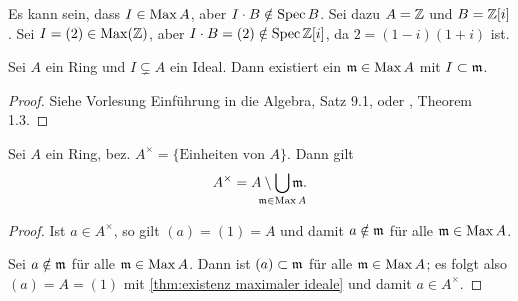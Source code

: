\documentclass[12pt,a4paper]{scrartcl}
\theoremstyle{cplain}
\theoremstyle{cdef}
\begin{document}
\begin{bem}
	Es kann sein, dass $I \in \operatorname{Max} A$, aber $I \cdot B \notin \operatorname{Spec} B$. Sei dazu $A=\mathbb Z$ und $B=\mathbb Z[i]$. Sei $I=(2) \in \operatorname{Max}(\mathbb Z)$, aber $I \cdot B = (2) \notin \operatorname{Spec} \mathbb Z[i]$, da $2=(1-i)(1+i)$ ist.
\end{bem}
\begin{satz} \label{thm:existenz maximaler ideale}
	Sei $A$ ein Ring und $I \subsetneq A$ ein Ideal. Dann existiert ein $\mathfrak{m} \in \operatorname{Max} A$ mit $I \subset \mathfrak{m}$.
	\begin{proof}
		Siehe Vorlesung Einführung in die Algebra, Satz 9.1, oder \cite{atiyah-macdonald}, Theorem 1.3.
	\end{proof}
\end{satz}
\begin{kor} \label{kor:einheiten und maximale ideale}
    Sei $A$ ein Ring, bez. $A^{\times}=\{\text{Einheiten von }A\}$. Dann gilt \[A^{\times}=A \setminus \bigcup_{\mathclap{\fm \in \Max A}} \fm.\]
	\begin{proof}
		Ist $a \in A^{\times}$, so gilt $(a)=(1)=A$ und damit $a \notin \mathfrak{m}$ für alle $\mathfrak{m} \in \operatorname{Max} A$.

		Sei $a \notin \mathfrak{m}$ für alle $\mathfrak{m} \in \operatorname{Max} A$. Dann ist $(a) \subset \mathfrak{m}$ für alle $\mathfrak{m} \in \operatorname{Max} A$; es folgt also $(a)=A=(1)$ mit \cref{thm:existenz maximaler ideale} und damit $a \in A^{\times}$.
	\end{proof}
\end{kor}
\end{document}

